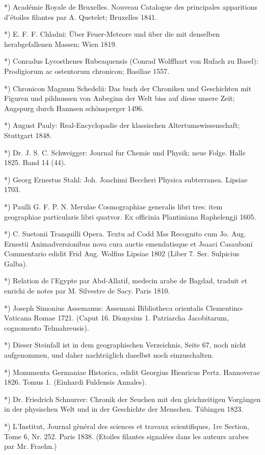\documentclass[a4paper, 11pt, oneside, polutonikogreek, german]{article}
\begin{document}
*) Académie Royale de Bruxelles. Nouveau Catalogue des principales apparitions d'étoiles filantes par A. Quetelet; Bruxelles 1841.

*) E. F. F. Chladni: Über Feuer-Meteore und über die mit denselben herabgefallenen Massen; Wien 1819.

*) Conradus Lycosthenes Rubeaquensis (Conrad Wolffhart von Rufach zu Basel): Prodigiorum ac ostentorum chronicon; Basiliae 1557.

*) Chronicon Magnum Schedelii: Das buch der Chroniken und Geschichten mit Figuren und pildnussen von Anbeginn der Welt biss auf diese unsere Zeit; Augspurg durch Hannsen schönsperger 1496.

*) August Pauly: Real-Encyclopadie der klassischen Altertumswissenschaft; Stuttgart 1848.

*) Dr. J. S. C. Schweigger: Journal fur Chemie und Physik; neue Folge. Halle 1825. Band 14 (44).

*) Georg Ernestus Stahl: Joh. Joachimi Beccheri Physica subterranea. Lipsiae 1703.

*) Paulli G. F. P. N. Merulae Cosmographiae generalis libri tres: item geographiae particularis libri quatvor. Ex officinia Plantiniana Raphelengji 1605.

*) C. Suetonii Tranquilli Opera. Textu ad Codd Mss Recognito cum Jo. Aug. Ernestii Animadversionibus nova cura auctis emendatisque et Jsaaci Casauboni Commentario edidit Frid Aug. Wolfius Lipsiae 1802 (Liber 7. Ser. Sulpicius Galba).

*) Relation de l'Egypte par Abd-Allatif, medecin arabe de Bagdad, traduit et enrichi de notes par M. Silvestre de Sacy. Paris 1810.

*) Joseph Simonius Assemanus: Assemani Bibliotheca orientalis Clementino-Vaticana Romae 1721. (Caput 16. Dionysius 1. Patriarcha Jacobitarum, cognomento Telmahreusis).

*) Dieser Steinfall ist in dem geographischen Verzeichnis, Seite 67, noch nicht aufgenommen, und daher nachträglich daselbst noch einzuschalten.

*) Monumenta Germaniae Historica, edidit Georgius Hienricus Pertz. Hannoverae 1826. Tomus 1. (Einhardi Fuldensis Annales).

*) Dr. Friedrich Schnurrer: Chronik der Seuchen mit den gleichzeitigen Vorgängen in der physischen Welt und in der Geschichte der Menschen. Tübingen 1823.

*) L'Institut, Journal gènéral des sciences et travaux scientifiques, 1re Section, Tome 6, Nr. 252. Paris 1838. (Etoiles filantes signalées dans les auteurs arabes par Mr. Fraehn.)
\end{document}
